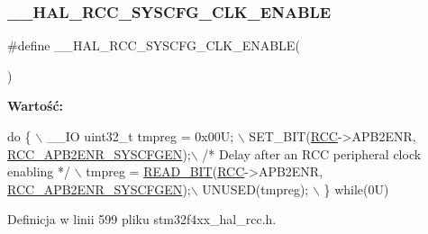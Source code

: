 \subsubsection{\texorpdfstring{\+\_\+\+\_\+\+H\+A\+L\+\_\+\+R\+C\+C\+\_\+\+S\+Y\+S\+C\+F\+G\+\_\+\+C\+L\+K\+\_\+\+E\+N\+A\+B\+LE}{\_\_HAL\_RCC\_SYSCFG\_CLK\_ENABLE}}
{\footnotesize\ttfamily \#define \+\_\+\+\_\+\+H\+A\+L\+\_\+\+R\+C\+C\+\_\+\+S\+Y\+S\+C\+F\+G\+\_\+\+C\+L\+K\+\_\+\+E\+N\+A\+B\+LE(\begin{DoxyParamCaption}{ }\end{DoxyParamCaption})}

{\bfseries Wartość\+:}
\begin{DoxyCode}
\textcolor{keywordflow}{do} \{ \(\backslash\)
                                        \_\_IO uint32\_t tmpreg = 0x00U; \(\backslash\)
                                        SET\_BIT(\hyperlink{group___peripheral__declaration_ga74944438a086975793d26ae48d5882d4}{RCC}->APB2ENR, 
      \hyperlink{group___peripheral___registers___bits___definition_ga7a9d56a8aa1fa0f519ecbdf0d19dd4da}{RCC\_APB2ENR\_SYSCFGEN});\(\backslash\)
                                        \textcolor{comment}{/* Delay after an RCC peripheral clock enabling */} \(\backslash\)
                                        tmpreg = \hyperlink{group___exported__macro_ga822bb1bb9710d5f2fa6396b84e583c33}{READ\_BIT}(\hyperlink{group___peripheral__declaration_ga74944438a086975793d26ae48d5882d4}{RCC}->APB2ENR, 
      \hyperlink{group___peripheral___registers___bits___definition_ga7a9d56a8aa1fa0f519ecbdf0d19dd4da}{RCC\_APB2ENR\_SYSCFGEN});\(\backslash\)
                                        UNUSED(tmpreg); \(\backslash\)
                                          \} \textcolor{keywordflow}{while}(0U)
\end{DoxyCode}


Definicja w linii 599 pliku stm32f4xx\+\_\+hal\+\_\+rcc.\+h.

\mbox{\label{group___r_c_c___a_p_b2___clock___enable___disable_ga2ea675ace35a7a536c9f4cec522f28bc}} 

